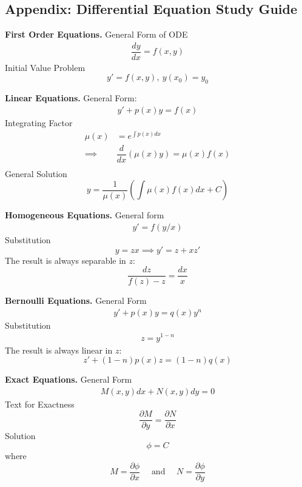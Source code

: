 \documentclass[../main.tex]{subfiles}
\begin{document}
\subsection*{Appendix: Differential Equation Study Guide}

    \textbf{First Order Equations.} General Form of ODE
    \begin{align*}
    \dfrac{dy}{dx}=f(x,y)
    \end{align*}
    Initial Value Problem
    \begin{equation*}
        y'=f(x,y),\ y(x_0) = y_0
    \end{equation*}

    \textbf{Linear Equations.} General Form: 
    \begin{align*}
    y'+p(x)y=f(x)
    \end{align*}
    Integrating Factor
    \begin{align*}
         \mu(x) &= e^{\int p(x)dx}\\
          \implies & \dfrac{d}{dx}\left( \mu(x) y \right) = \mu(x) f(x)\\
    \end{align*}
General Solution
\begin{equation*}
    y=\frac{1}{\mu(x)}\left( \int \mu(x) f(x) dx + C\right)
\end{equation*}

\textbf{Homogeneous Equations.} General form
\begin{align*}
 y'=f(y/x)
\end{align*}
Substitution
\begin{equation*}
    y=zx  \implies y'=z + xz'
\end{equation*}
The result is always separable in $z$: 
    \begin{equation*}
    \dfrac{dz}{f(z)-z} = \dfrac{dx}{x}
    \end{equation*}

\textbf{Bernoulli Equations.} General Form
    \begin{align*}
y'+p(x)y=q(x)y^n
    \end{align*}
    Substitution\begin{align*}
        z = y^{1-n}
    \end{align*}
    The result is always linear in $z$:
    \begin{equation*}
     z' +(1-n)p(x) z = (1-n)q(x)
    \end{equation*}

    \textbf{Exact Equations.} General Form
    \begin{align*}
M(x,y)dx + N(x,y)dy = 0 
    \end{align*}
    Text for Exactness
    \begin{equation*}
        \dfrac{\partial M}{\partial y}=\dfrac{\partial N}{\partial x}
    \end{equation*}
    Solution
    \begin{equation*}
        \phi=C
    \end{equation*}
where
\begin{equation*}
    M=\dfrac{\partial \phi}{\partial x}\quad\text{ and }\quad N=\dfrac{\partial \phi}{\partial y}
\end{equation*}
\end{document}
